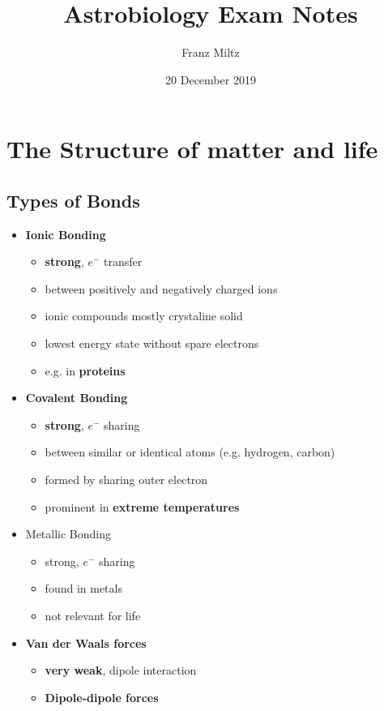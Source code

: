 \documentclass{article}
\title{Astrobiology Exam Notes}
\date{20 December 2019}
\author{Franz Miltz}
\theoremstyle{sltheorem}
\begin{document}
\maketitle
\tableofcontents
\pagebreak
\section{The Structure of matter and life}
\subsection{Types of Bonds}
\begin{itemize}
	\item \textbf{Ionic Bonding}
	      \begin{itemize}
		      \item \textbf{strong}, $e^-$ transfer
		      \item between positively and negatively charged ions
		      \item ionic compounds mostly crystaline solid
		      \item lowest energy state without spare electrons
		      \item e.g. in \textbf{proteins}
	      \end{itemize}
	\item \textbf{Covalent Bonding}
	      \begin{itemize}
		      \item \textbf{strong}, $e^-$ sharing
		      \item between similar or identical atoms (e.g. hydrogen, carbon)
		      \item formed by sharing outer electron
		      \item prominent in \textbf{extreme temperatures}
	      \end{itemize}
	\item Metallic Bonding
	      \begin{itemize}
		      \item strong, $e^-$ sharing
		      \item found in metals
		      \item not relevant for life
	      \end{itemize}
	\item \textbf{Van der Waals forces}
	      \begin{itemize}
		      \item \textbf{very weak}, dipole interaction
		      \item \textbf{Dipole-dipole forces}

\end{itemize}
\end{itemize}
\end{document}
